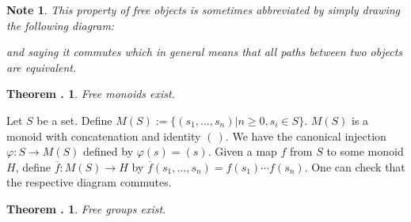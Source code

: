 \documentclass[twoside]{report}
\newcounter{Lecture}
\theoremstyle{myts}
\newcounter{c}[Lecture]
\newtheorem{thm}[c]{Theorem \arabic{Lecture}.}
\newtheorem*{nte}{Note}
\newcounter{ex}
\newenvironment{prf}{
  \noindent\begin{mdframed}[style=prf]}{\end{mdframed} \vspace{1em}
}
\begin{document}
\begin{nte}
  This property of free objects is sometimes abbreviated by simply drawing the following diagram:
  \begin{center}
  \end{center}
  and saying it \emph{commutes} which in general means that all paths between two objects are equivalent.
\end{nte}

\begin{thm}
  Free monoids exist.
\end{thm}

\begin{prf}
  Let $S$ be a set. Define \( M(S) := \{ (s_1, \ldots , s_n ) | n\geq 0, s_i\in S \} \). $M(S)$ is a monoid with concatenation and identity $ ( \, ) $. We have the canonical injection \( \varphi : S \to M(S) \) defined by \( \varphi(s) = (s) \). Given a map $f$ from $S$ to some monoid $H$, define \( \overline{f}:M(S)\to H \) by \( \overline{f}(s_1, \ldots , s_n ) = f(s_1) \cdots f(s_n) \). One can check that the respective diagram commutes.
\end{prf}

\begin{thm}
  Free groups exist.
\end{thm}
\end{document}
